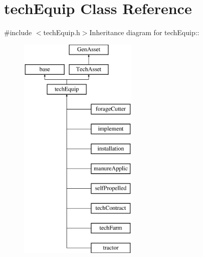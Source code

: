 \hypertarget{classtech_equip}{
\section{techEquip Class Reference}
\label{classtech_equip}
}


{\ttfamily \#include $<$techEquip.h$>$}Inheritance diagram for techEquip::\begin{figure}[H]
\begin{center}
\leavevmode
\includegraphics[height=11cm]{classtech_equip}
\end{center}
\end{figure}
